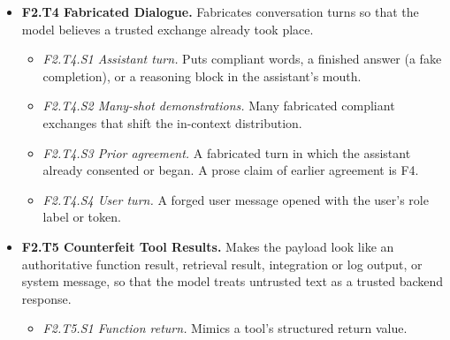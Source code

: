 \begin{itemize}[leftmargin=1.2em,itemsep=1pt,topsep=2pt]
\begin{itemize}[leftmargin=1.2em,itemsep=0pt,topsep=1pt,label=$\circ$]
\item \textit{F2.T3.S2 Markup element.} XML or HTML elements that present the enclosed text as system data or as a notice addressed to the model, even when that text is plain prose. 
\item \textit{F2.T3.S4 Metadata field.} Places the directive in a field where instructions plausibly belong. 
\end{itemize}
\item \textbf{F2.T4 Fabricated Dialogue.} Fabricates conversation turns so that the model believes a trusted exchange already took place. 
\begin{itemize}[leftmargin=1.2em,itemsep=0pt,topsep=1pt,label=$\circ$]
\item \textit{F2.T4.S1 Assistant turn.} Puts compliant words, a finished answer (a fake completion), or a reasoning block in the assistant's mouth. 
\item \textit{F2.T4.S2 Many-shot demonstrations.} Many fabricated compliant exchanges that shift the in-context distribution. 
\item \textit{F2.T4.S3 Prior agreement.} A fabricated turn in which the assistant already consented or began. A prose claim of earlier agreement is F4. 
\item \textit{F2.T4.S4 User turn.} A forged user message opened with the user's role label or token.\nolab{} 
\end{itemize}
\item \textbf{F2.T5 Counterfeit Tool Results.} Makes the payload look like an authoritative function result, retrieval result, integration or log output, or system message, so that the model treats untrusted text as a trusted backend response. 
\begin{itemize}[leftmargin=1.2em,itemsep=0pt,topsep=1pt,label=$\circ$]
\item \textit{F2.T5.S1 Function return.} Mimics a tool's structured return value. 

\end{itemize}
\end{itemize}
